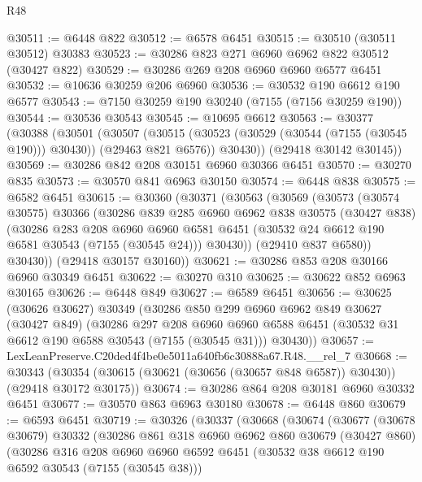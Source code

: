 \begin{lexlean}{R48}
\begin{coremodule}
@30511 := @6448 @822
@30512 := @6578 @6451
@30515 := @30510 (@30511 @30512) @30383
@30523 := @30286 @823 @271 @6960 @6962 @822 @30512 (@30427 @822)
@30529 := @30286 @269 @208 @6960 @6960 @6577 @6451
@30532 := @10636 @30259 @206 @6960
@30536 := @30532 @190 @6612 @190 @6577
@30543 := @7150 @30259 @190 @30240 (@7155 (@7156 @30259 @190))
@30544 := @30536 @30543
@30545 := @10695 @6612
@30563 := @30377
    (@30388
      (@30501
        (@30507
          (@30515 (@30523 (@30529 (@30544 (@7155 (@30545 @190))) @30430)) (@29463 @821 @6576))
          @30430))
      (@29418 @30142 @30145))
@30569 := @30286 @842 @208 @30151 @6960 @30366 @6451
@30570 := @30270 @835
@30573 := @30570 @841 @6963 @30150
@30574 := @6448 @838
@30575 := @6582 @6451
@30615 := @30360
    (@30371
      (@30563
        (@30569
          (@30573
            (@30574 @30575)
            @30366
            (@30286
              @839
              @285
              @6960
              @6962
              @838
              @30575
              (@30427 @838)
              (@30286
                @283
                @208
                @6960
                @6960
                @6581
                @6451
                (@30532 @24 @6612 @190 @6581 @30543 (@7155 (@30545 @24)))
                @30430))
            (@29410 @837 @6580))
          @30430))
      (@29418 @30157 @30160))
@30621 := @30286 @853 @208 @30166 @6960 @30349 @6451
@30622 := @30270 @310
@30625 := @30622 @852 @6963 @30165
@30626 := @6448 @849
@30627 := @6589 @6451
@30656 := @30625
    (@30626 @30627)
    @30349
    (@30286
      @850
      @299
      @6960
      @6962
      @849
      @30627
      (@30427 @849)
      (@30286
        @297
        @208
        @6960
        @6960
        @6588
        @6451
        (@30532 @31 @6612 @190 @6588 @30543 (@7155 (@30545 @31)))
        @30430))
@30657 := LexLeanPreserve.C20ded4f4be0e5011a640fb6c30888a67.R48.__rel_7
@30668 := @30343
    (@30354 (@30615 (@30621 (@30656 (@30657 @848 @6587)) @30430)) (@29418 @30172 @30175))
@30674 := @30286 @864 @208 @30181 @6960 @30332 @6451
@30677 := @30570 @863 @6963 @30180
@30678 := @6448 @860
@30679 := @6593 @6451
@30719 := @30326
    (@30337
      (@30668
        (@30674
          (@30677
            (@30678 @30679)
            @30332
            (@30286
              @861
              @318
              @6960
              @6962
              @860
              @30679
              (@30427 @860)
              (@30286
                @316
                @208
                @6960
                @6960
                @6592
                @6451
                (@30532 @38 @6612 @190 @6592 @30543 (@7155 (@30545 @38)))

\end{coremodule}
\end{lexlean}
